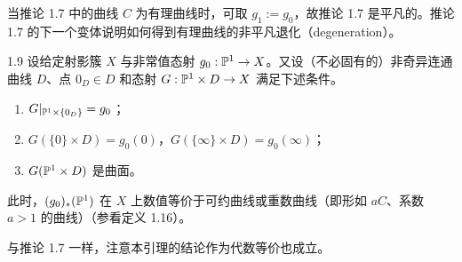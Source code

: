 当推论 1.7 中的曲线 $C$ 为有理曲线时，可取 $g_1:=g_0$，故推论 1.7 是平凡的。推论 1.7 的下一个变体说明如何得到有理曲线的非平凡退化（degeneration）。

\begin{lemma*}[{折弯引理 II}]{1.9}
设给定射影簇 $X$ 与非常值态射 $g_0:\mathbb{P}^1\to X$。又设（不必固有的）非奇异连通曲线 $D$、点 $0_D\in D$ 和态射 $G:\mathbb{P}^1\times D\to X$ 满足下述条件。
\begin{enumerate}[label=(\arabic*),leftmargin=2.4em,itemsep=1pt,topsep=2pt]
\item $G|_{\mathbb{P}^1\times\{0_D\}}=g_0$；
\item $G(\{0\}\times D)=g_0(0)$，$G(\{\infty\}\times D)=g_0(\infty)$；
\item $G(\mathbb{P}^1\times D)$ 是曲面。
\end{enumerate}
此时，$(g_0)_*(\mathbb{P}^1)$ 在 $X$ 上数值等价于可约曲线或重数曲线（即形如 $aC$、系数 $a>1$ 的曲线）（参看定义 1.16）。
\end{lemma*}

与推论 1.7 一样，注意本引理的结论作为代数等价也成立。

